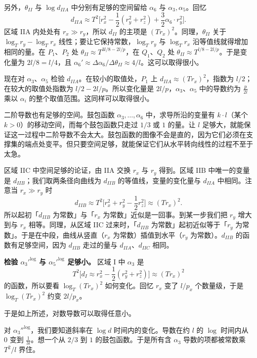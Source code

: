 另外，$\theta_{II}$ 与 $\log d_{IIA}$ 中分别有足够的空间留给 $\alpha_6$ 与 $\alpha_3,\alpha_5$。回忆
\[
d_{IIA}\approx T^2\Big[r_x^2-\frac12(r_y^2+r_z^2)+\frac32\alpha_6\cdot r_y^2\Big].
\]
区域 IIA 内处处有 $r_x\gg r_y$，所以 $d_{II}$ 的主项是 $(Tr_x)^2$。同理，$\theta_{II}$ 关于 $\log_Tr_y-\log_Tr_x$ 线性；要让它保持常数，$\log_Tr_y$ 与 $\log_Tr_x$ 沿等值线就得增加相同的量。在 $P_1$、$P_2$ 处 $\theta_{II}\approx T^{3l/8-2l/p}$，在 $Q_1$、$Q_2$ 处 $\theta_{II}\approx T^{l/8-2l/p}$。于是变化量为 $2l/8=l/4$，且 $\alpha_6'\approx\Delta\alpha_6/\Delta\theta_{II}\approx4/l$。这可以取得很小。

现在对 $\alpha_3$、$\alpha_5$ 检验 $d_{IIA}$。在较小的取值处，$P_1$ 上 $d_{IIA}\approx(Tr_x)^2$，指数为 $l/2$；在较大的取值处指数为 $l/2-2l/p$。所以变化量是 $2l/p$，$\alpha_3$、$\alpha_5$ 中的导数约为 $\frac{p}{2l}$ 乘以 $\alpha_i$ 的整个取值范围。这同样可以取得很小。

二阶导数也有足够的空间。鼓包函数 $\alpha_3,\dots,\alpha_6$ 中，求导所沿的变量有 $k\cdot l$（某个 $k>0$）的移动空间，而每个鼓包函数只走过 $1/3$ 或 $1$ 的量。让 $l$ 足够大，就能保证这一过程中二阶导数不会太大。鼓包函数的图像不会是直的，因为它们必须在支撑集的端点处变平。但只要空间足够，就能保证它们从水平转向线性的过程不至于太急。

区域 IIC 中空间足够的论证，由 IIA 交换 $r_x$ 与 $r_y$ 得到。区域 IIB 中唯一的变量是 $d_{IIB}$；我们取两条径向曲线为 $d_{IIB}$ 的等值线，变量的变化量与 $d_{IIA}$ 中相同。注意当 $r_x\gg r_y$ 时
\[
d_{IIB}\approx T^2\Big[r_x^2+r_y^2-\frac12r_z^2\Big]\approx(Tr_x)^2.
\]
所以起初「$d_{IIB}$ 为常数」与「$r_x$ 为常数」近似是一回事。到某一步我们把 $r_y$ 增大到与 $r_x$ 相等。同理，从区域 IIC 过来时，「$d_{IIB}$ 为常数」起初近似等于「$r_y$ 为常数」。于是在中段，曲线从竖直（$r_x$ 为常数）插值到水平（$r_y$ 为常数）。$d_{IIB}$ 的函数有足够空间，因为 $d_{IIB}$ 走过的量与 $d_{IIA}$、$d_{IIC}$ 相同。

\medskip
\noindent\textbf{检验 ${\alpha_3'}^{\log}$ 与 ${\alpha_5'}^{\log}$ 足够小。} 区域 I 中 $\alpha_3$ 是
\[
T^2\Big[d_I\approx r_x^2-\frac12(r_y^2+r_z^2)\Big]\approx(Tr_x)^2
\]
的函数，所以要看 $\log_T(Tr_x)^2$ 如何变化。回忆 $r_x$ 变了 $l/p_x$ 个数量级，于是 $\log_T(Tr_x)^2$ 约变 $2l/p_x$。

于是如上所述，对数导数可以取得任意小。

对 ${\alpha_3''}^{\log}$，我们要知道斜率在 $\log d$ 时间内的变化。导数在约 $l$ 的 $\log$ 时间内从 $0$ 变到 $\frac{1}{3l}$。想一个从 $2/3$ 到 $1$ 的鼓包函数。于是所有含 $\alpha_3$ 导数的项都被常数乘 $T^2/l$ 界住。

